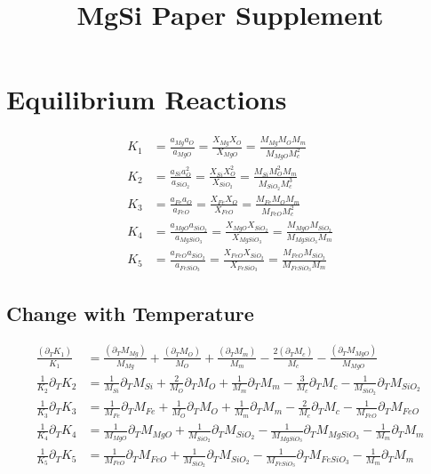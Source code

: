 \documentclass[]{article}
\date{}
\title{MgSi Paper Supplement}
\begin{document}
\maketitle

\section{Equilibrium Reactions}\label{equilibrium-reactions}

\begin{align}
K_{1} &= \frac{a_{Mg}a_{O}}{ a_{MgO}} = \frac{X_{Mg} X_O }{X_{MgO}} = \frac{M_{Mg}M_{O}M_m}{M_{MgO}M_c^2}\\
K_{2} &= \frac{a_{Si}a_{O}^2}{ a_{SiO_2}} = \frac{X_{Si} X_O^2 }{X_{SiO_2}} = \frac{M_{Si}M_{O}^2M_m}{M_{SiO_2}M_c^3}\\
K_{3} &= \frac{a_{Fe}a_{O}}{ a_{FeO}} = \frac{X_{Fe} X_O }{X_{FeO}} = \frac{M_{Fe}M_{O}M_m}{M_{FeO}M_c^2}\\
K_{4} &= \frac{a_{MgO}a_{SiO_2}}{ a_{MgSiO_3}} = \frac{X_{MgO} X_{SiO_2} }{X_{MgSiO_3}} = \frac{M_{MgO}M_{SiO_2}}{M_{MgSiO_3}M_m}​\\
K_{5} &= \frac{a_{FeO}a_{SiO_2}}{ a_{FeSiO_3}} = \frac{X_{FeO} X_{SiO_2} }{X_{FeSiO_3}} = \frac{M_{FeO}M_{SiO_2}}{M_{FeSiO_3}M_m}
\end{align}

\subsection{Change with Temperature}\label{change-with-temperature}
\begin{align}
\frac{(\partial_T K_1)}{K_1} &= \frac{(\partial_T M_{Mg})}{M_{Mg}} + \frac{(\partial_T M_{O})}{M_{O}} + \frac{(\partial_T M_{m})}{M_{m}} - \frac{2(\partial_T M_{c})}{M_{c}} - \frac{(\partial_T M_{MgO})}{M_{MgO}}
\\
\frac{1}{K_2}\partial_T K_2 &= \frac{1}{M_{Si}}\partial_T M_{Si} +
\frac{2}{M_{O}}\partial_T M_{O} + \frac{1}{M_{m}}\partial_T M_{m} -
\frac{3}{M_{c}}\partial_T M_{c} -
\frac{1}{M_{SiO_2}}\partial_T M_{SiO_2} \\
\frac{1}{K_3}\partial_T K_3 &= \frac{1}{M_{Fe}}\partial_T M_{Fe} +\frac{1}{M_{O}}\partial_T M_{O} +\frac{1}{M_{m}}\partial_T M_{m}-\frac{2}{M_{c}}\partial_T M_{c} - \frac{1}{M_{FeO}}\partial_T M_{FeO}\\
\frac{1}{K_4}\partial_T K_4 &= \frac{1}{M_{MgO}}\partial_T M_{MgO} +\frac{1}{M_{SiO_2}}\partial_T M_{SiO_2} -\frac{1}{M_{MgSiO_3}}\partial_T M_{MgSiO_3} -\frac{1}{M_{m}}\partial_T M_{m} \\
\frac{1}{K_5}\partial_T K_5 &= \frac{1}{M_{FeO}}\partial_T M_{FeO} +
\frac{1}{M_{SiO_2}}\partial_T M_{SiO_2} -
\frac{1}{M_{FeSiO_3}}\partial_T M_{FeSiO_3} -
\frac{1}{M_{m}}\partial_T M_{m} \\
\end{align}
\end{document}
